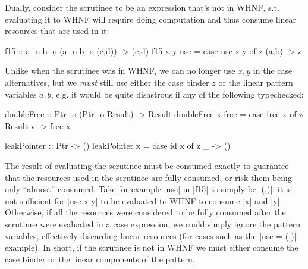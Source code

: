 \documentclass[acmsmall, screen, review]{acmart}
\begin{document}
Dually, consider the scrutinee to be an expression that's not in WHNF, s.t.
evaluating it to WHNF will require doing computation and thus consume linear
resources that are used in it:
\begin{notyet}
\begin{code}
f15 :: a -o b -o (a -o b -o (c,d)) -> (c,d)
f15 x y use = case use x y of z { (a,b) -> z }
\end{code}
\end{notyet}
Unlike when the scrutinee was in WHNF, we can no longer use $x,y$ in the case
alternatives, but we \emph{must} still use either the case binder $z$ or the linear
pattern variables $a,b$, e.g. it would be quite disastrous if any of the following typechecked:
\begin{noway}
\begin{code}
doubleFree :: Ptr -o (Ptr -o Result) -> Result
doubleFree x free = case free x of z { Result v -> free x }
\end{code}
\end{noway}
\begin{noway}
\begin{code}
leakPointer :: Ptr -> ()
leakPointer x = case id x of z { _ -> () }
\end{code}
\end{noway}
%
%
The result of evaluating the scrutinee must be consumed exactly to guarantee
that the resources used in the scrutinee are fully consumed, or risk them being only ``almost'' consumed. Take for example
|use| in |f15| to simply be |(,)|: it is not sufficient for |use x y| to be
evaluated to WHNF to consume |x| and |y|. Otherwise, if all the resources were
considered to be fully consumed after the scrutinee were evaluated in a case
expression, we could simply ignore the pattern variables, effectively
discarding linear resources (for cases such as the |use = (,)| example). In
short, if the scrutinee is not in WHNF we must either consume the case binder
or the linear components of the pattern.
\end{document}
